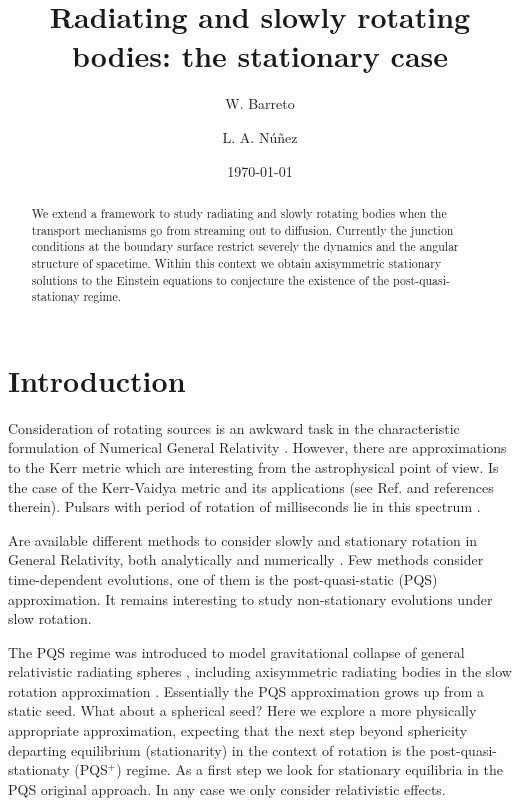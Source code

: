 \documentclass[twocolumn,superscriptaddress]{revtex4}
\begin{document}
\title{{Radiating and slowly rotating bodies: the stationary case}}
\author{W. Barreto}
\author{L. A. N\'u\~nez}
\date{\today}
\begin{abstract}
We extend a framework to study radiating and slowly rotating bodies when the transport mechanisms go from streaming out to diffusion. Currently the junction conditions at the boundary surface restrict severely the dynamics and the angular structure of spacetime. Within this context we obtain axisymmetric stationary solutions to the Einstein equations to conjecture the existence of the {post-quasi-stationay} regime.
\end{abstract}
\maketitle
\section{Introduction}
Consideration of rotating sources is an awkward task in the characteristic formulation of Numerical General Relativity \cite{w12, bv06, pi98}. However, there are approximations to the Kerr metric which are interesting from the astrophysical point of view. Is the case of the Kerr-Vaidya metric \cite{ck77} and its applications (see Ref. \cite{hmnp94} and references therein). Pulsars with period of rotation of milliseconds lie in this spectrum \cite{bk90,wgw91}.  

Are available different methods to consider slowly and stationary rotation in General Relativity, both analytically and numerically \cite{h67,ht68}. Few methods consider time-dependent evolutions, one of them is the post-quasi-static (PQS) approximation. It remains interesting to study non-stationary evolutions under slow rotation. 

The PQS regime was introduced to model gravitational collapse of general relativistic radiating spheres \cite{hjr80,hbds02}, including axisymmetric radiating bodies in the slow rotation approximation \cite{hmnp94}. Essentially the PQS approximation grows up from a static seed. What about a spherical seed? Here we explore a more physically appropriate approximation, expecting that the next step beyond sphericity departing equilibrium (stationarity) in the context of rotation is the post-quasi-stationaty (PQS$^+$) regime. As a first step we look for stationary equilibria in the PQS original approach. In any case we only consider relativistic effects.
\end{document}
